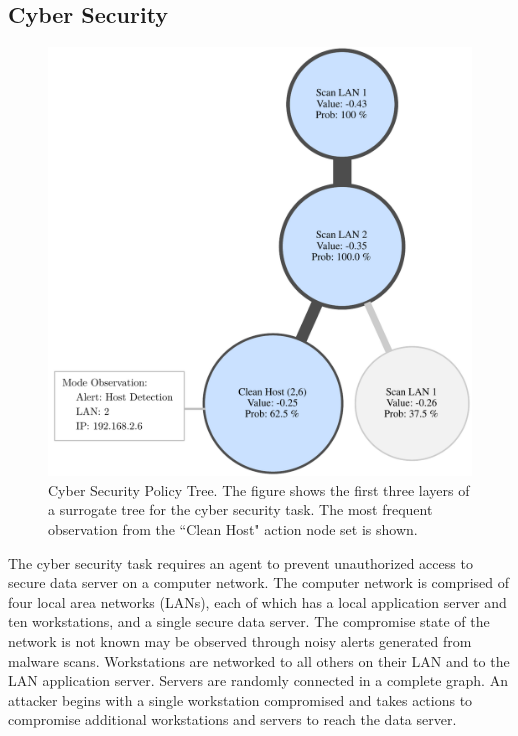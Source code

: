 \documentclass[letterpaper]{article} %
\begin{document}
\subsection{Cyber Security}
\begin{figure}[t]
\centering
\includegraphics[width=0.99\columnwidth]{figs/cyber_tree.pdf}
\caption{Cyber Security Policy Tree. The figure shows the first three layers of a surrogate tree for the cyber security task. The most frequent observation from the ``Clean Host" action node set is shown.}
\label{fig: cyber tree}
\end{figure}
The cyber security task requires an agent to prevent unauthorized access to secure data server on a computer network.
The computer network is comprised of four local area networks (LANs), each of which has a local application server and ten workstations, and a single secure data server.
The compromise state of the network is not known may be observed through noisy alerts generated from malware scans.
Workstations are networked to all others on their LAN and to the LAN application server.
Servers are randomly connected in a complete graph.
An attacker begins with a single workstation compromised and takes actions to compromise additional workstations and servers to reach the data server.
\end{document}
